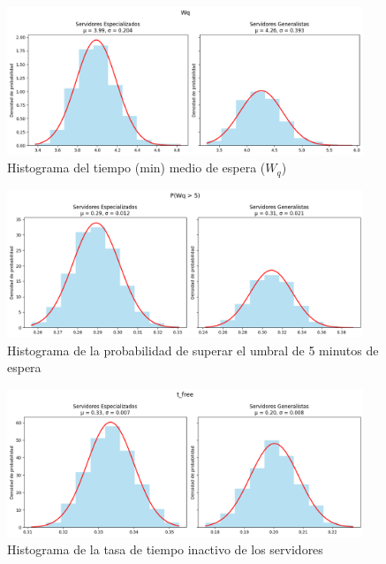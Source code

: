 \documentclass[letterpaper, 12pt]{report}
\begin{document}
\begin{figure}[H]
    \centering
    \includegraphics[width=0.95\textwidth]{images/Wq.png}
    \caption{Histograma del tiempo (min) medio de espera ($W_q$)}
    \label{fig:espera}
\end{figure}

\vspace{2cm}

\begin{figure}[H]
    \centering
    \includegraphics[width=0.95\textwidth]{images/PWqovertk.png}
    \caption{Histograma de la probabilidad de superar el umbral de 5 minutos de espera}
    \label{fig:probabilidad}
\end{figure}


\begin{figure}[H]
    \centering
    \includegraphics[width=0.95\textwidth]{images/tfree.png}
    \caption{Histograma de la tasa de tiempo inactivo de los servidores}
    \label{fig:inactividad}
\end{figure}
\end{document}
